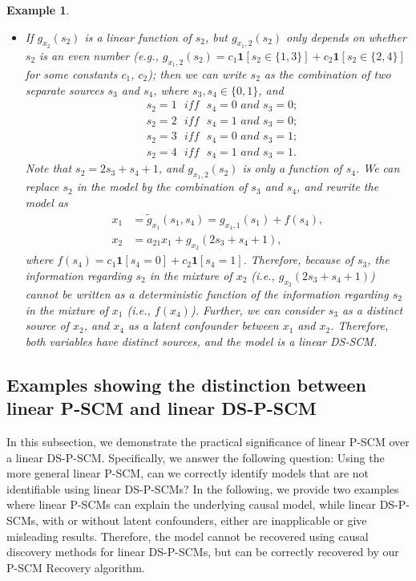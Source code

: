 \documentclass[12pt]{article}
\newtheorem{example}{Example}
\begin{document}
\begin{example}
\begin{itemize}
    \item If $g_{x_2} (s_2)$ is a linear function of $s_2$, but $g_{x_1,2} (s_2)$ only depends on whether $s_2$ is an even number (e.g., $g_{x_1,2} (s_2)=c_1\mathbf{1}[s_2\in \{1,3\}] + c_2\mathbf{1}[s_2\in \{2,4\}]$ for some constants $c_1$, $c_2$); then we can write $s_2$ as the combination of two separate sources $s_3$ and $s_4$, where $s_3, s_4\in \{0,1\}$, and 
    \begin{align*}
    &s_2=1 \textit{~~iff~~} s_4=0 \textit{~and~} s_3=0;\\
    &s_2=2 \textit{~~iff~~} s_4=1 \textit{~and~} s_3=0;\\
    &s_2=3 \textit{~~iff~~} s_4=0 \textit{~and~} s_3=1;\\
    &s_2=4 \textit{~~iff~~} s_4=1 \textit{~and~} s_3=1.
    \end{align*}
    Note that $s_2 = 2s_3+s_4+1$, and $g_{x_1,2} (s_2)$ is only a function of $s_4$. We can replace $s_2$ in the model by the combination of $s_3$ and $s_4$, and rewrite the model as
    \begin{align*}
    x_1 &= \tilde{g}_{x_1}(s_1, s_4)=g_{x_1,1}(s_1) + f(s_4), \\
    x_2 &= a_{21} x_1 + g_{x_2} (2s_3 + s_4+1),
    \end{align*}
    where $f(s_4) = c_1\mathbf{1}[s_4=0] + c_2\mathbf{1}[s_4=1]$.
    Therefore, because of $s_3$, the information regarding $s_2$ in the mixture of $x_2$ (i.e., $g_{x_2} (2s_3 + s_4+1)$) cannot be written as a deterministic function of the information regarding $s_2$ in the mixture of $x_1$ (i.e., $f(x_4)$). Further, we can consider $s_3$ as a distinct source of $x_2$, and $x_4$ as a latent confounder between $x_1$ and $x_2$. Therefore, both variables have distinct sources, and the model is a linear DS-SCM.
\end{itemize}

\end{example}


\subsection{Examples showing the distinction between linear P-SCM and linear DS-P-SCM} \label{app:example_equivalence}
In this subsection, we demonstrate the practical significance of linear P-SCM over a linear DS-P-SCM. Specifically, we answer the following question: Using the more general linear P-SCM, can we correctly identify models that are not identifiable using linear DS-P-SCMs? In the following, we provide two examples where linear P-SCMs can explain the underlying causal model, while linear DS-P-SCMs, with or without latent confounders, either are inapplicable or give misleading results. Therefore, the model cannot be recovered using causal discovery methods for linear DS-P-SCMs, but can be correctly recovered by our P-SCM Recovery algorithm.
\end{document}
